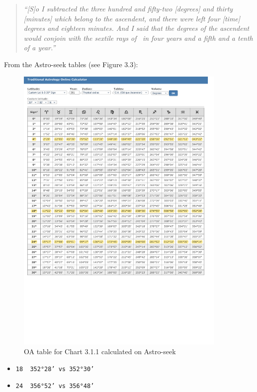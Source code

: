 \begin{quote}
\textsl{ ``[S]o I subtracted the three hundred and fifty-two [degrees] and thirty [minutes] which belong to the ascendent, and there were left four [time] degrees and eighteen minutes. And I said that the degrees of the ascendent would conjoin with the sextile rays of \Mars\, in four years and a fifth and a tenth of a year.''}
\end{quote}
From the Astro-seek tables (see Figure 3.3):

\begin{figure}[H]
\centering
\includegraphics[width=0.9\textwidth]
	{diagrams/3.1.1-OA-Table }
\vspace{-8em}
\caption{OA table for Chart 3.1.1 calculated on Astro-seek}
\end{figure}

\begin{itemize}[topsep=0em,itemsep=0em]
\item[] \texttt{18\Pisces\,        352°28'    vs       352°30'}
\item[] \texttt{24\Pisces\,        356°52'    vs       356°48'}
\end{itemize}

